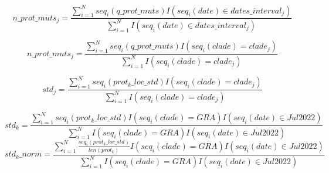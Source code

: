 \documentclass[a4paper, 12pt]{article}
\begin{document}
$$
n\_prot\_muts_j = \frac{\sum_{i=1}^{N} seq_i(q\_prot\_muts)I(seq_i(date) \in dates\_interval_j)}{\sum_{i=1}^{N} I(seq_i(date) \in dates\_interval_j)}
$$

$$
n\_prot\_muts_j = \frac{\sum_{i=1}^{N} seq_i(q\_prot\_muts)I(seq_i(clade) = clade_j)}{\sum_{i=1}^{N}I(seq_i(clade) = clade_j)}
$$

$$
std_j = \frac{\sum_{i=1}^{N} seq_i(prot_k\_loc\_std)I(seq_i(clade) = clade_j)}{\sum_{i=1}^{N}I(seq_i(clade) = clade_j)}
$$

$$
std_k = \frac{\sum_{i=1}^{N} seq_i(prot_k\_loc\_std)I(seq_i(clade) = GRA)I(seq_i(date) \in Jul2022)}{\sum_{i=1}^{N}I(seq_i(clade) = GRA)I(seq_i(date) \in Jul2022)}
$$
$$
std_k\_norm = \frac{\sum_{i=1}^{N} \frac{seq_i(prot_k\_loc\_std)}{len(prot_k)}I(seq_i(clade) = GRA)I(seq_i(date) \in Jul2022)}{\sum_{i=1}^{N}I(seq_i(clade) = GRA)I(seq_i(date) \in Jul2022)}
$$
\end{document}
